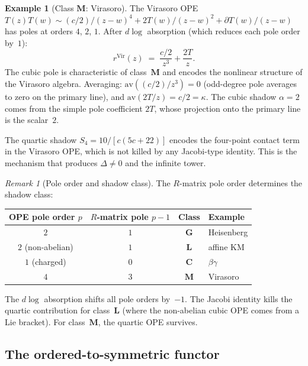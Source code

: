\documentclass[11pt,reqno]{amsart}
\theoremstyle{definition}
\newtheorem{example}[theorem]{Example}
\theoremstyle{remark}
\newtheorem{remark}[theorem]{Remark}
\newcommand{\Vir}{\mathrm{Vir}}
\numberwithin{equation}{section}
\begin{document}
\begin{example}[Class $\mathbf{M}$:
Virasoro]\label{ex:r-vir}
The Virasoro OPE
$T(z)T(w) \sim (c/2)/(z-w)^4 + 2T(w)/(z-w)^2
+ \partial T(w)/(z-w)$ has poles at orders $4$, $2$, $1$.
After $d\!\log$ absorption (which reduces each pole order
by~$1$):
\[
 r^{\Vir}(z)
 \;=\;
 \frac{c/2}{z^3} + \frac{2T}{z}.
\]
The cubic pole is characteristic of class~$\mathbf{M}$
and encodes the nonlinear structure of the Virasoro algebra.
Averaging:
$\mathrm{av}((c/2)/z^3) = 0$ (odd-degree pole averages
to zero on the primary line), and
$\mathrm{av}(2T/z) = c/2 = \kappa$. The cubic shadow
$\alpha = 2$ comes from the simple pole coefficient
$2T$, whose projection onto the primary line is the scalar~$2$.

The quartic shadow $S_4 = 10/[c(5c+22)]$ encodes the
four-point contact term in the Virasoro OPE, which is
not killed by any Jacobi-type identity. This is the
mechanism that produces $\Delta \ne 0$ and the infinite
tower.
\end{example}

\begin{remark}[Pole order and shadow
class]\label{rem:pole-class}
The $R$-matrix pole order determines the shadow class:
\begin{center}
\renewcommand{\arraystretch}{1.2}
\begin{tabular}{cccl}
\toprule
OPE pole order $p$ & $R$-matrix pole $p{-}1$
 & Class & Example \\
\midrule
$2$ & $1$ & $\mathbf{G}$
 & Heisenberg \\
$2$ (non-abelian) & $1$ & $\mathbf{L}$
 & affine KM \\
$1$ (charged) & $0$ & $\mathbf{C}$
 & $\beta\gamma$ \\
$4$ & $3$ & $\mathbf{M}$
 & Virasoro \\
\bottomrule
\end{tabular}
\end{center}
The $d\!\log$ absorption shifts all pole orders by~$-1$.
The Jacobi identity kills the quartic contribution for
class~$\mathbf{L}$ (where the non-abelian cubic OPE comes
from a Lie bracket). For class~$\mathbf{M}$, the quartic
OPE survives.
\end{remark}

\subsection{The ordered-to-symmetric
functor}\label{subsec:ord-to-sym}
\end{document}
